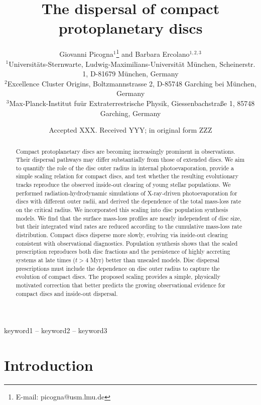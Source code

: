 \documentclass[letters,fleqn,usenatbib]{mnras}
\title[The dispersal of compact protoplanetary discs]{The dispersal of compact protoplanetary discs}
\author[G. Picogna et al.]{
Giovanni Picogna$^{1}$\thanks{E-mail: picogna@usm.lmu.de}
and Barbara Ercolano$^{1,2,3}$
\\
$^{1}$Universit\"{a}ts-Sternwarte, Ludwig-Maximilians-Universit\"{a}t M\"{u}nchen, Scheinerstr. 1, D-81679 M\"{u}nchen, Germany\\
$^{2}$Excellence Cluster Origins, Boltzmannstrasse 2, D-85748 Garching bei M\"{u}nchen, Germany\\
$^{3}$Max-Planck-Institut fu\"{u}r Extraterrestrische Physik, Giessenbachstraße 1, 85748 Garching, Germany
}
\date{Accepted XXX. Received YYY; in original form ZZZ}
\begin{document}
\label{firstpage}
\pagerange{\pageref{firstpage}--\pageref{lastpage}}
\maketitle

\begin{abstract}
Compact protoplanetary discs are becoming increasingly prominent in observations. Their dispersal pathways may differ substantially from those of extended discs. We aim to quantify the role of the disc outer radius in internal photoevaporation, provide a simple scaling relation for compact discs, and test whether the resulting evolutionary tracks reproduce the observed inside-out clearing of young stellar populations. We performed radiation-hydrodynamic simulations of X-ray-driven photoevaporation for discs with different outer radii, and derived the dependence of the total mass-loss rate on the critical radius. We incorporated this scaling into disc population synthesis models. We find that the surface mass-loss profiles are nearly independent of disc size, but their integrated wind rates are reduced according to the cumulative mass-loss rate distribution. Compact discs disperse more slowly, evolving via inside-out clearing consistent with observational diagnostics. Population synthesis shows that the scaled prescription reproduces both disc fractions and the persistence of highly accreting systems at late times ($t > 4$ Myr) better than unscaled models. Disc dispersal prescriptions must include the dependence on disc outer radius to capture the evolution of compact discs. The proposed scaling provides a simple, physically motivated correction that better predicts the growing observational evidence for compact discs and inside-out dispersal.
\end{abstract}

\begin{keywords}
keyword1 -- keyword2 -- keyword3
\end{keywords}



\section{Introduction}\label{sec:introduction}
\end{document}
